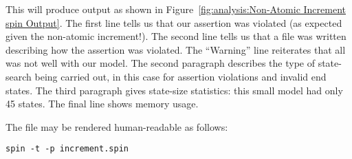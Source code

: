 This will produce output as shown in
Figure~\ref{fig:analysis:Non-Atomic Increment spin Output}.
The first line tells us that our assertion was violated (as expected
given the non-atomic increment!).
The second line tells us that a  file was written describing how the
assertion was violated.
The ``Warning'' line reiterates that all was not well with our model.
The second paragraph describes the type of state-search being carried out,
in this case for assertion violations and invalid end states.
The third paragraph gives state-size statistics: this small model had only
45 states.
The final line shows memory usage.

The  file may be rendered human-readable as follows:

\vspace{5pt}
\begin{minipage}[t]{\columnwidth}
\scriptsize
\begin{verbatim}
spin -t -p increment.spin
\end{verbatim}
\end{minipage}
\vspace{5pt}

